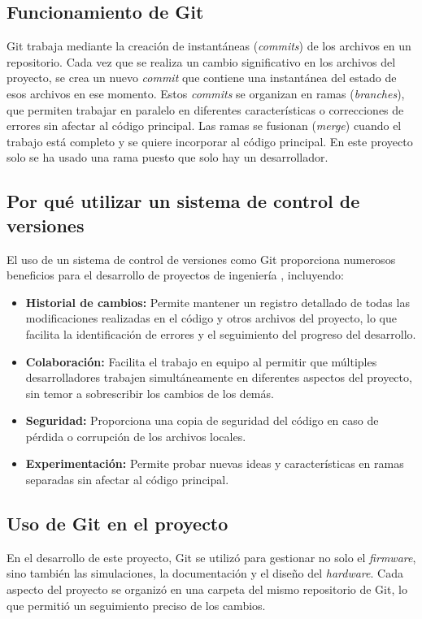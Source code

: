 \subsection{Funcionamiento de Git}
Git trabaja mediante la creación de instantáneas (\textit{commits}) de los archivos en un repositorio. Cada vez que se realiza un cambio significativo en los archivos del proyecto, se crea un nuevo \textit{commit} que contiene una instantánea del estado de esos archivos en ese momento. Estos \textit{commits} se organizan en ramas (\textit{branches}), que permiten trabajar en paralelo en diferentes características o correcciones de errores sin afectar al código principal. Las ramas se fusionan (\textit{merge}) cuando el trabajo está completo y se quiere incorporar al código principal. En este proyecto solo se ha usado una rama puesto que solo hay un desarrollador.

\subsection{Por qué utilizar un sistema de control de versiones}
El uso de un sistema de control de versiones como Git proporciona numerosos beneficios para el desarrollo de proyectos de ingeniería \cite{GestionProyectos}, incluyendo:

\begin{itemize}
	\item \textbf{Historial de cambios:} Permite mantener un registro detallado de todas las modificaciones realizadas en el código y otros archivos del proyecto, lo que facilita la identificación de errores y el seguimiento del progreso del desarrollo.
	\item \textbf{Colaboración:} Facilita el trabajo en equipo al permitir que múltiples desarrolladores trabajen simultáneamente en diferentes aspectos del proyecto, sin temor a sobrescribir los cambios de los demás.
	\item \textbf{Seguridad:} Proporciona una copia de seguridad del código en caso de pérdida o corrupción de los archivos locales.
	\item \textbf{Experimentación:} Permite probar nuevas ideas y características en ramas separadas sin afectar al código principal.
\end{itemize}

\subsection{Uso de Git en el proyecto}
En el desarrollo de este proyecto, Git se utilizó para gestionar no solo el \textit{firmware}, sino también las simulaciones, la documentación y el diseño del \textit{hardware}. Cada aspecto del proyecto se organizó en una carpeta del mismo repositorio de Git, lo que permitió un seguimiento preciso de los cambios.

